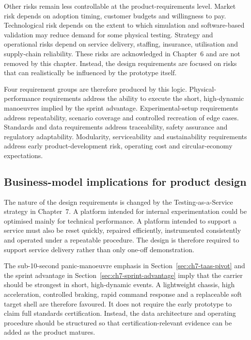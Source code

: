 Other risks remain less controllable at the product-requirements level. Market risk depends on adoption timing, customer budgets and willingness to pay. Technological risk depends on the extent to which simulation and software-based validation may reduce demand for some physical testing. Strategy and operational risks depend on service delivery, staffing, insurance, utilisation and supply-chain reliability. These risks are acknowledged in Chapter~6 and are not removed by this chapter. Instead, the design requirements are focused on risks that can realistically be influenced by the prototype itself.

Four requirement groups are therefore produced by this logic. Physical-performance requirements address the ability to execute the short, high-dynamic manoeuvres implied by the sprint advantage. Experimental-setup requirements address repeatability, scenario coverage and controlled recreation of edge cases. Standards and data requirements address traceability, safety assurance and regulatory adaptability. Modularity, serviceability and sustainability requirements address early product-development risk, operating cost and circular-economy expectations.

\subsection{Business-model implications for product design}
\label{sec:ch8_business_model_implications}

The nature of the design requirements is changed by the Testing-as-a-Service strategy in Chapter~7. A platform intended for internal experimentation could be optimised mainly for technical performance. A platform intended to support a service must also be reset quickly, repaired efficiently, instrumented consistently and operated under a repeatable procedure. The design is therefore required to support service delivery rather than only one-off demonstration.

The sub-10-second panic-manoeuvre emphasis in Section~\ref{sec:ch7-taas-pivot} and the sprint advantage in Section~\ref{sec:ch7-sprint-advantage} imply that the carrier should be strongest in short, high-dynamic events. A lightweight chassis, high acceleration, controlled braking, rapid command response and a replaceable soft target shell are therefore favoured. It does not require the early prototype to claim full standards certification. Instead, the data architecture and operating procedure should be structured so that certification-relevant evidence can be added as the product matures.

